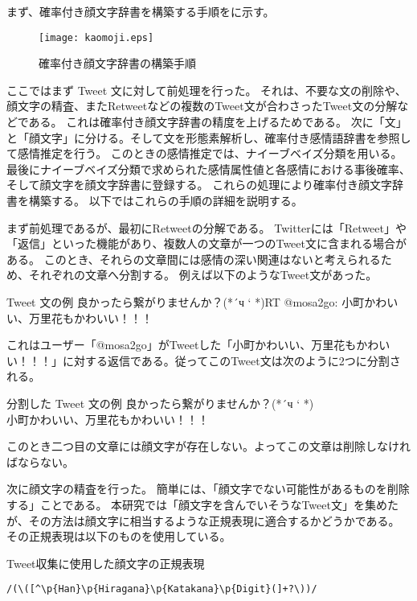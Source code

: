 \documentclass[11pt,a4j]{jsarticle}
\begin{document}
まず、確率付き顔文字辞書を構築する手順をに示す。

\begin{figure}[h]
  \texttt{[image: kaomoji.eps]}
  \caption{確率付き顔文字辞書の構築手順}
  \label{fig:kaomoji}
\end{figure}

ここではまず Tweet 文に対して前処理を行った。
それは、不要な文の削除や、顔文字の精査、またRetweetなどの複数のTweet文が合わさったTweet文の分解などである。
これは確率付き顔文字辞書の精度を上げるためである。
次に「文」と「顔文字」に分ける。そして文を形態素解析し、確率付き感情語辞書を参照して感情推定を行う。
このときの感情推定では、ナイーブベイズ分類を用いる。
最後にナイーブベイズ分類で求められた感情属性値と各感情における事後確率、そして顔文字を顔文字辞書に登録する。
これらの処理により確率付き顔文字辞書を構築する。
以下ではこれらの手順の詳細を説明する。

まず前処理であるが、最初にRetweetの分解である。
Twitterには「Retweet」や「返信」といった機能があり、複数人の文章が一つのTweet文に含まれる場合がある。
このとき、それらの文章間には感情の深い関連はないと考えられるため、それぞれの文章へ分割する。
例えば以下のようなTweet文があった。

\begin{itembox}{Tweet 文の例}
    良かったら繋がりませんか？(*´ч ` *)RT @mosa2go: 小町かわいい、万里花もかわいい！！！
  \end{itembox}

  これはユーザー「@mosa2go」がTweetした「小町かわいい、万里花もかわいい！！！」に対する返信である。従ってこのTweet文は次のように2つに分割される。

  \begin{itembox}{分割した Tweet 文の例}
    良かったら繋がりませんか？(*´ч ` *) \\
    小町かわいい、万里花もかわいい！！！
  \end{itembox}

  このとき二つ目の文章には顔文字が存在しない。よってこの文章は削除しなければならない。

  次に顔文字の精査を行った。
  簡単には、「顔文字でない可能性があるものを削除する」ことである。
  本研究では「顔文字を含んでいそうなTweet文」を集めたが、その方法は顔文字に相当するような正規表現に適合するかどうかである。
  その正規表現は以下のものを使用している。
  \begin{itembox}{Tweet収集に使用した顔文字の正規表現}
      \begin{verbatim}
/(\([^\p{Han}\p{Hiragana}\p{Katakana}\p{Digit}(]+?\))/
      \end{verbatim}
  \end{itembox}
  
\end{document}
